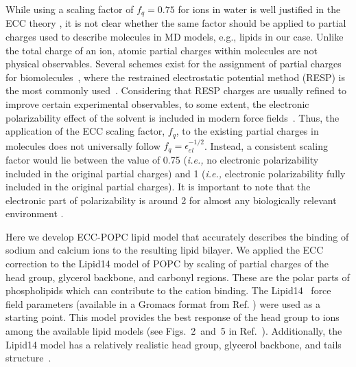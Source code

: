 \documentclass[aip,jcp,twocolumn]{revtex4}
\begin{document}
While using a scaling factor of $f_q = 0.75$ for ions in water is well justified in the ECC theory \cite{Leontyev2011}, it is not clear whether the same factor should be applied to partial charges used to describe molecules in MD models, e.g., lipids in our case. Unlike the total charge of an ion, atomic partial charges within molecules are not physical observables. Several schemes exist for the assignment of partial charges for biomolecules~\cite{Hu2007}, where the restrained electrostatic potential method (RESP) is the most commonly used~\cite{RESP_paper, Singh1984}. Considering that RESP charges are usually refined to improve certain experimental observables, to some extent,  the electronic polarizability effect of the solvent is included in modern force fields~\cite{RESP_paper, Singh1984, jorgensen96, ipolq2013, benavides17}. Thus, the application of the ECC scaling factor, $f_q$, to the existing partial charges in molecules does not universally follow $f_q = \epsilon _{el} ^{-1/2}$. Instead, a consistent scaling factor would lie between the value of 0.75  (\textit{i.e.,} no electronic polarizability included in the original partial charges) and 1 (\textit{i.e.,} electronic polarizability fully included in the original partial charges). It is important to note that the electronic part of polarizability is around 2 for almost any biologically relevant environment \cite{some_original_work, leontyev11}.

Here we develop ECC-POPC lipid model that accurately describes the binding of sodium and calcium ions to the resulting lipid bilayer. We applied the ECC correction to the Lipid14 model of POPC by scaling of partial charges of the head group, glycerol backbone, and carbonyl regions. These are the polar parts of phospholipids which can contribute to the cation binding. The Lipid14~\cite{dickson14} force field parameters (available in a Gromacs format from Ref. ) were used as a starting point. This model provides the best response of the head group to ions among the available lipid models (see Figs.~2~and~5 in Ref.~). Additionally, the Lipid14 model has a relatively realistic head group, glycerol backbone, and tails structure~\cite{botan15}.
\end{document}
